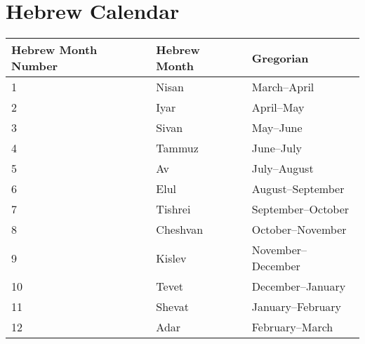 \section{Hebrew Calendar}

\begin{center}
    \begin{tabularx}{\textwidth}{@{}lll@{}}
        \toprule
        Hebrew Month Number & Hebrew Month & Gregorian \\
        \midrule
        1 & Nisan & March--April \\
        2 & Iyar & April--May \\
        3 & Sivan & May--June \\
        4 & Tammuz & June--July \\
        5 & Av & July--August \\
        6 & Elul & August--September \\
        7 & Tishrei & September--October \\
        8 & Cheshvan & October--November \\
        9 & Kislev & November--December \\
        10 & Tevet & December--January \\
        11 & Shevat & January--February \\
        12 & Adar & February--March \\
        \bottomrule
    \end{tabularx}
\end{center}

